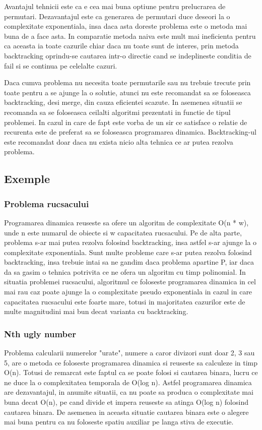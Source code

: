 \documentclass[runningheads]{llncs}
\begin{document}
Avantajul tehnicii este ca e cea mai buna optiune pentru prelucrarea de permutari. Dezavantajul este ca
generarea de permutari duce deseori la o complexitate exponentiala, insa daca asta doreste problema este
o metoda mai buna de a face asta. In comparatie metoda naiva este mult mai ineficienta pentru ca aceasta
ia toate cazurile chiar daca nu toate sunt de interes, prin metoda backtracking oprindu-se
cautarea intr-o directie cand se indeplineste conditia de fail si se continua pe celelalte cazuri.

Daca cumva problema nu necesita toate permutarile sau nu trebuie trecute
prin toate pentru a se ajunge la o solutie, atunci nu este recomandat sa se foloseasca backtracking, desi
merge, din cauza eficientei scazute. In asemenea situatii se recomanda sa se foloseasca ceilalti algoritmi
prezentati in functie de tipul problemei. In cazul in care de fapt este vorba de un sir ce satisface o
relatie de recurenta este de preferat sa se foloseasca programarea dinamica. Backtracking-ul este recomandat
doar daca nu exista nicio alta tehnica ce ar putea rezolva problema.
\subsection{Exemple}
\subsubsection{Problema rucsacului}
Programarea dinamica reuseste sa ofere un algoritm de complexitate
O(n * w), unde n este numarul de obiecte si w capacitatea rucsacului. Pe de alta parte, problema
s-ar mai putea rezolva folosind backtracking, insa astfel s-ar ajunge la o complexitate exponentiala. Sunt
multe probleme care s-ar putea rezolva folosind backtracking, insa trebuie intai sa ne gandim daca problema
apartine P, iar daca da sa gasim o tehnica potrivita ce ne ofera un algoritm cu timp polinomial.
In situatia problemei rucsacului, algoritmul ce foloseste programarea dinamica in cel mai rau caz poate ajunge 
la o complexitate pseudo exponentiala in cazul
in care capacitatea rucsacului este foarte mare, totusi in majoritatea cazurilor este de multe magnitudini mai
bun decat varianta cu backtracking.

\subsubsection{Nth ugly number}
Problema calcularii numerelor "urate", numere a caror divizori sunt doar 2, 3 sau 5,
are o metoda ce foloseste programarea dinamica si reuseste sa calculeze in timp O(n). Totusi de remarcat este faptul ca
se poate folosi si cautarea binara, lucru ce ne duce la o complexitatea temporala de O(log n). Astfel programarea
dinamica are dezavantajul, in anumite situatii, ca nu poate sa produca o complexitate mai buna decat O(n), pe cand
divide et impera reuseste sa atinga O(log n) folosind cautarea binara. De asemenea in aceasta situatie cautarea
binara este o alegere mai buna pentru ca nu foloseste spatiu auxiliar pe langa stiva de executie.
\end{document}
